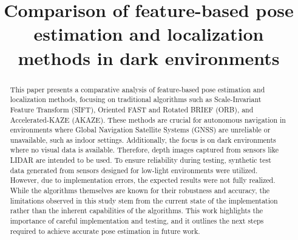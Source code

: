\documentclass[conference, a4paper]{IEEEtran}
\begin{document}


\title{Comparison of feature-based pose estimation and localization methods in dark environments}

\author{
}

\maketitle

\begin{abstract}
This paper presents a comparative analysis of feature-based pose estimation and localization methods, focusing on traditional algorithms such as Scale-Invariant Feature Transform (SIFT), Oriented FAST and Rotated BRIEF (ORB), and Accelerated-KAZE (AKAZE). These methods are crucial for autonomous navigation in environments where Global Navigation Satellite Systems (GNSS) are unreliable or unavailable, such as indoor settings. Additionally, the focus is on dark environments where no visual data is available. Therefore, depth images captured from sensors like LIDAR are intended to be used. To ensure reliability during testing, synthetic test data generated from sensors designed for low-light environments were utilized. However, due to implementation errors, the expected results were not fully realized. While the algorithms themselves are known for their robustness and accuracy, the limitations observed in this study stem from the current state of the implementation rather than the inherent capabilities of the algorithms. This work highlights the importance of careful implementation and testing, and it outlines the next steps required to achieve accurate pose estimation in future work.
\end{abstract}

\IEEEpeerreviewmaketitle
\end{document}
